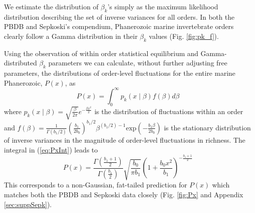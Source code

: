 \documentclass[12pt]{article}
\begin{document}
We estimate the distribution of $\beta_k$'s simply as the maximum
likelihood distribution describing the set of inverse variances for
all orders. In both the PBDB and Sepkoski's compendium, Phanerozoic
marine invertebrate orders clearly follow a Gamma distribution in
their $\beta_k$ values (Fig. \ref{fig:pk_f}).  

Using the observation of within order statistical equilibrium and
Gamma-distributed $\beta_k$ parameters we can calculate, without
further adjusting free parameters, the distributions of order-level
fluctuations for the entire marine Phanerozoic, $P(x)$, as
\begin{equation}
  P(x) = \int_0^\infty p_k(x \mid \beta) f(\beta) d\beta \label{eq:PxInt}
\end{equation}
where
$p_k(x \mid \beta) = \sqrt{\frac{\beta}{2\pi}} e^{-\frac{\beta
    x^2}{2}}$ is the distribution of fluctuations within an order and
$f(\beta) = \frac{1}{\Gamma(b_1/2)}
\left(\frac{b_1}{2b_0}\right)^{b_1/2} \beta^{(b_1/2) - 1}
\text{exp}\left(-\frac{b_1 \beta}{2 b_0}\right)$ is the stationary
distribution of inverse variances in the magnitude of order-level
fluctuations in richness. The integral in (\ref{eq:PxInt}) leads to
\begin{equation}
  P(x) = \frac{\Gamma\left(\frac{b_1 +
        1}{2}\right)}{\Gamma\left(\frac{b_1}{2}\right)}
  \sqrt{\frac{b_0}{\pi b_1}} \left(1 + \frac{b_0
      x^2}{b_1}\right)^{-\frac{b_1 + 1}{2}}
\end{equation}
This corresponds to a non-Gaussian, fat-tailed prediction for
$P(x)$ which matches both the PBDB and Sepkoski data closely
(Fig. \ref{fig:Px} and Appendix \ref{sec:suppSepk}).
\end{document}
